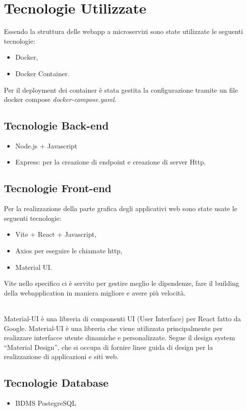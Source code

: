 \section{Tecnologie Utilizzate}
Essendo la struttura delle webapp a microservizi  sono state utilizzate le seguenti tecnologie:
\begin{itemize}
    \item Docker,
    \item Docker Container.
\end{itemize}

Per il deployment dei container è stata gestita la configurazione tramite un file docker compose \textit{docker-compose.yaml}.
\subsection{Tecnologie Back-end}
\begin{itemize}
    \item Node.js + Javascript
    \item Express: per la creazione di endpoint e creazione di server Http. 
\end{itemize}

\subsection{Tecnologie Front-end}
Per la realizzazione della parte grafica degli applicativi web sono state usate le seguenti tecnologie:
\begin{itemize}
    \item Vite + React + Javascript,
    \item Axios per eseguire le chiamate http,
    \item Material UI.
\end{itemize}

Vite nello specifico ci è servito per gestire meglio le dipendenze, fare il building della webapplication in maniera migliore e avere più velocità. \\\

Material-UI è una libreria di componenti UI (User Interface) per React fatto da Google. Material-UI è una libreria che viene utilizzata principalmente per realizzare interfacce utente dinamiche e personalizzate.
Segue il design system “Material Design”, che si occupa di fornire linee guida di design per la realizzazione di applicazioni e siti web.\\

\subsection{Tecnologie Database}
\begin{itemize}
    \item BDMS PostegreSQL
\end{itemize}


